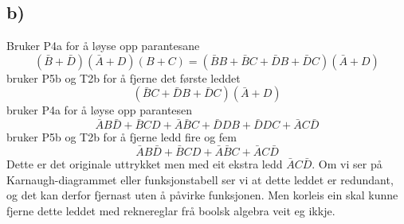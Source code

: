 \documentclass[12pt,a4paper]{article}
\begin{document}
    \subsection{b)}
      Bruker P4a for å løyse opp parantesane
      \begin{equation}
        (\bar{B} + \bar{D})(\bar{A} + D)(B + C) =
        (\bar{B}B + \bar{B}C + \bar{D}B + \bar{D}C)(\bar{A}+D)
      \end{equation}
      bruker P5b og T2b for å fjerne det første leddet
      \begin{equation}
        (\bar{B}C + \bar{D}B + \bar{D}C)(\bar{A}+D)
      \end{equation}
      bruker P4a for å løyse opp parantesen
      \begin{equation}
        \bar{A}B\bar{D} + \bar{B}CD + \bar{A}\bar{B}C + \bar{D}DB + \bar{D}DC + \bar{A}C\bar{D}
      \end{equation}
      bruker P5b og T2b for å fjerne ledd fire og fem
      \begin{equation}
        \bar{A}B\bar{D} + \bar{B}CD + \bar{A}\bar{B}C + \bar{A}C\bar{D}
      \end{equation}
      Dette er det originale uttrykket men med eit ekstra ledd $\bar{A}C\bar{D}$. Om vi
      ser på Karnaugh-diagrammet eller funksjonstabell ser vi at dette leddet er redundant,
      og det kan derfor fjernast uten å påvirke funksjonen. Men korleis ein skal kunne fjerne
      dette leddet med reknereglar frå boolsk algebra veit eg ikkje.
\end{document}
